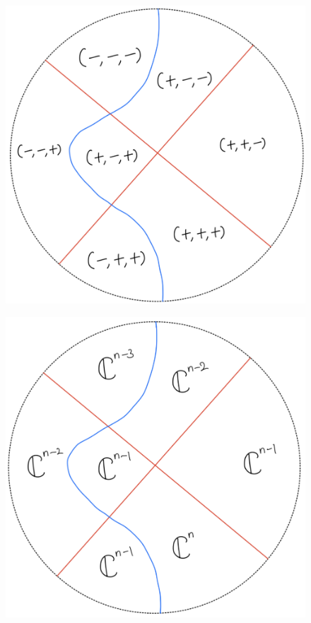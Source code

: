 \begin{figure}[H]
    \centering
    \includegraphics[scale = 0.95]{diagrams/lemma4/26.png}
    \caption{}
    \label{fig:your-label}
\end{figure}
\begin{figure}[H]
    \centering
    \includegraphics[scale = 0.95]{diagrams/cobord'4/27.png}
    \caption{}
    \label{fig:your-label}
\end{figure}
